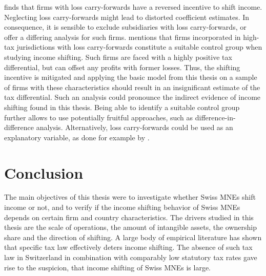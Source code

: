 \documentclass[10pt,twocolumn,oneside,cmyk]{article}
\begin{document}
\textcite[19]{overesch_transfer_2006} finds that firms with loss carry-forwards have a reversed incentive to shift income. Neglecting loss carry-forwards might lead to distorted coefficient estimates. In consequence, it is sensible to exclude subsidiaries with loss carry-forwards, or offer a differing analysis for such firms. \textcite[9-10]{overesch_effects_2009} mentions that firms incorporated in high-tax jurisdictions with loss carry-forwards constitute a suitable control group when studying income shifting. Such firms are faced with a highly positive tax differential, but can offset any profits with former losses. Thus, the shifting incentive is mitigated and applying the basic model from this thesis on a sample of firms with these characteristics should result in an insignificant estimate of the tax differential. Such an analysis could pronounce the indirect evidence of income shifting found in this thesis. Being able to identify a suitable control group further allows to use potentially fruitful approaches, such as difference-in-difference analysis. Alternatively, loss carry-forwards could be used as an explanatory variable, as done for example by \textcite[74]{buettner_internal_2013}.

\section{Conclusion} \label{sec:Conclusion}
The main objectives of this thesis were to investigate whether Swiss MNEs shift income or not, and to verify if the income shifting behavior of Swiss MNEs depends on certain firm and country characteristics. The drivers studied in this thesis are the scale of operations, the amount of intangible assets, the ownership share and the direction of shifting. A large body of empirical literature has shown that specific tax law effectively deters income shifting. The absence of such tax law in Switzerland in combination with comparably low statutory tax rates gave rise to the suspicion, that income shifting of Swiss MNEs is large.
\end{document}
